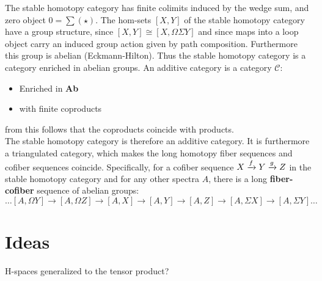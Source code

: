 The stable homotopy category has finite colimits induced by the wedge sum, and zero object $0=\sum(\star)$. The hom-sets $[X, Y]$ of the stable homotopy category have a group structure, since $[X, Y] \cong [X, \Omega \Sigma Y]$ and since maps into a loop object carry an induced group action given by path composition. Furthermore this group is abelian (Eckmann-Hilton). Thus the stable homotopy category is a category enriched in abelian groups.
An additive category is a category $\mathcal{C}$:
\begin{itemize}
\item Enriched in \textbf{Ab}
\item with finite coproducts
\end{itemize}
from this follows that the coproducts coincide with products.\\
The stable homotopy category is therefore an additive category.
It is furthermore a triangulated category, which makes the long homotopy fiber sequences and cofiber sequences coincide. Specifically, for a cofiber sequence $X \xrightarrow{f} Y \xrightarrow{g} Z$ in the stable homotopy category and for any other spectra $A$, there is a long \textbf{fiber-cofiber} sequence of abelian groups:
\[
\dots [A, \Omega Y] \to [A, \Omega Z] \to [A, X] \to [A, Y] \to [A, Z] \to [A, \Sigma X] \to [A, \Sigma Y] \dots
\]
\newpage
\section{Ideas}
H-spaces generalized to the tensor product?
